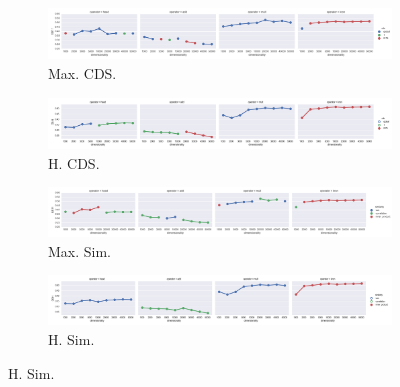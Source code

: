 \begin{landscape}
\begin{figure}
  \begin{subfigure}[t]{0.7\textwidth}
    \includegraphics[width=\textwidth]{supplement/figures/GS11-max_-selection-cds}
    \caption{Max. CDS.}
    \label{fig:}
  \end{subfigure}
  \begin{subfigure}[t]{0.7\textwidth}
    \includegraphics[width=\textwidth]{supplement/figures/GS11-heuristics-selection-cds}
    \caption{H. CDS.}
    \label{fig:}
  \end{subfigure}

  \begin{subfigure}[t]{0.7\textwidth}
    \includegraphics[width=\textwidth]{supplement/figures/GS11-max_-selection-similarity}
    \caption{Max. Sim.}
    \label{fig:}
  \end{subfigure}
  \begin{subfigure}[t]{0.7\textwidth}
    \includegraphics[width=\textwidth]{supplement/figures/GS11-heuristics-selection-similarity}
    \caption{H. Sim.}
    \label{fig:}
  \end{subfigure}


\end{figure}
\end{landscape}
